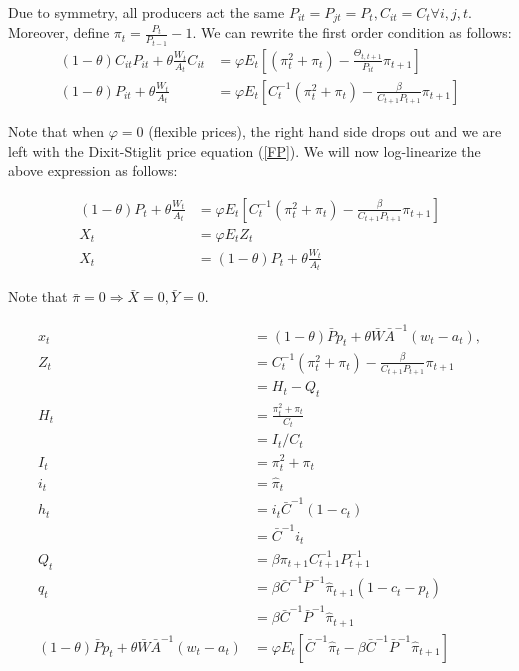 \documentclass[11pt]{article} %
\begin{document}
Due to symmetry, all producers act the same $P_{it} = P_{jt} = P_t,C_{it}=C_t \forall i,j,t$. Moreover, define $\pi_t = \frac{P_t}{P_{t-1} }-1$. We can rewrite the first order condition as follows:
\begin{align*}
  (1-\theta)C_{it}P_{it} + \theta\frac{W_t}{A_t}C_{it} &=\varphi E_t\left[ (\pi_t^2 + \pi_t) - \frac{\Theta_{t,t+1}}{P_{it}}\pi_{t+1}  \right]\\
  (1-\theta)P_{it} + \theta\frac{W_t}{A_t} &=\varphi E_t\left[ C_t^{-1}(\pi_t^2 + \pi_t) - \frac{\beta}{C_{t+1}P_{t+1}}\pi_{t+1}  \right]
\end{align*}

Note that when $\varphi = 0$ (flexible prices), the right hand side drops out and we are left with the Dixit-Stiglit price equation (\ref{FP}). We will now log-linearize the above expression as follows:

\begin{align*}
 (1-\theta)P_{t} + \theta\frac{W_t}{A_t} &=\varphi E_t\left[ C_t^{-1}(\pi_t^2 + \pi_t) - \frac{\beta}{C_{t+1}P_{t+1}}\pi_{t+1}  \right]\\
X_t &= \varphi E_t Z_t\\
X_t &=  (1-\theta)P_{t} + \theta\frac{W_t}{A_t}
\end{align*}

Note that $\bar{\pi} = 0 \Rightarrow \bar{X} = 0, \bar{Y} = 0.$

\begin{align*}
x_t &= (1-\theta)\bar{P}p_t + \theta\bar{W}\bar{A}^{-1}(w_t - a_t),\\
Z_t &= C_t^{-1}(\pi_t^2 + \pi_t) - \frac{\beta}{C_{t+1}P_{t+1}}\pi_{t+1}\\
&= H_t - Q_t \\
H_t &= \frac{\pi_t^2 + \pi_t}{C_t}\\
&= I_t/C_t \\
I_t &= \pi_t^2 + \pi_t\\
i_t &= \hat{\pi}_t\\
h_t &= i_t\bar{C}^{-1}(1-c_t)\\
&= \bar{C}^{-1}i_t\\
Q_t &= \beta\pi_{t+1}C_{t+1}^{-1}P_{t+1}^{-1}\\
q_t &= \beta\bar{C}^{-1}\bar{P}^{-1}\hat{\pi}_{t+1}(1-c_t - p_t)\\
&= \beta\bar{C}^{-1}\bar{P}^{-1}\hat{\pi}_{t+1}\\
(1-\theta)\bar{P}p_t + \theta\bar{W}\bar{A}^{-1}(w_t - a_t) &= \varphi E_t[ \bar{C}^{-1}\hat{\pi}_t -  \beta\bar{C}^{-1}\bar{P}^{-1}\hat{\pi}_{t+1}]
\end{align*}
\end{document}
